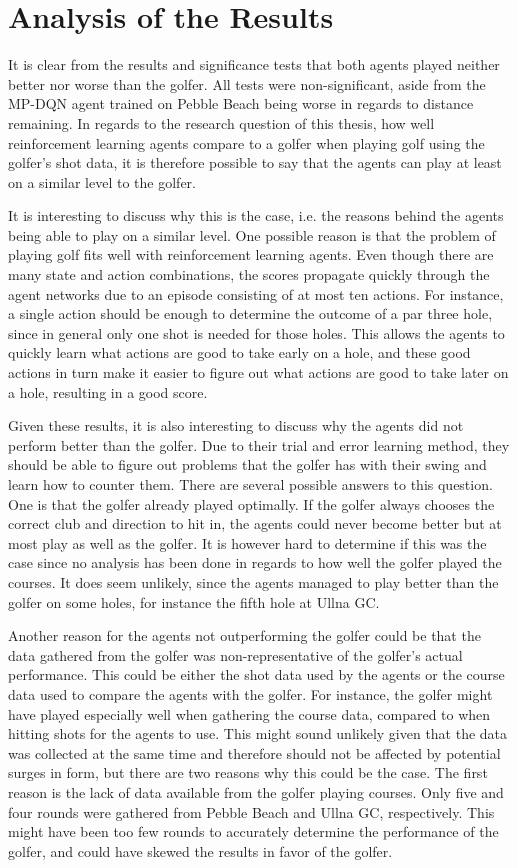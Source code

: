 \documentclass{kththesis}
\begin{document}
\section{Analysis of the Results}
It is clear from the results and significance tests that both agents played neither better nor worse than the golfer. All tests were non-significant, aside from the MP-DQN agent trained on Pebble Beach being worse in regards to distance remaining. In regards to the research question of this thesis, how well reinforcement learning agents compare to a golfer when playing golf using the golfer's shot data, it is therefore possible to say that the agents can play at least on a similar level to the golfer.

It is interesting to discuss why this is the case, i.e. the reasons behind the agents being able to play on a similar level. One possible reason is that the problem of playing golf fits well with reinforcement learning agents. Even though there are many state and action combinations, the scores propagate quickly through the agent networks due to an episode consisting of at most ten actions. For instance, a single action should be enough to determine the outcome of a par three hole, since in general only one shot is needed for those holes. This allows the agents to quickly learn what actions are good to take early on a hole, and these good actions in turn make it easier to figure out what actions are good to take later on a hole, resulting in a good score.

Given these results, it is also interesting to discuss why the agents did not perform better than the golfer. Due to their trial and error learning method, they should be able to figure out problems that the golfer has with their swing and learn how to counter them. There are several possible answers to this question. One is that the golfer already played optimally. If the golfer always chooses the correct club and direction to hit in, the agents could never become better but at most play as well as the golfer. It is however hard to determine if this was the case since no analysis has been done in regards to how well the golfer played the courses. It does seem unlikely, since the agents managed to play better than the golfer on some holes, for instance the fifth hole at Ullna GC. 

Another reason for the agents not outperforming the golfer could be that the data gathered from the golfer was non-representative of the golfer's actual performance. This could be either the shot data used by the agents or the course data used to compare the agents with the golfer. For instance, the golfer might have played especially well when gathering the course data, compared to when hitting shots for the agents to use. This might sound unlikely given that the data was collected at the same time and therefore should not be affected by potential surges in form, but there are two reasons why this could be the case. The first reason is the lack of data available from the golfer playing courses. Only five and four rounds were gathered from Pebble Beach and Ullna GC, respectively. This might have been too few rounds to accurately determine the performance of the golfer, and could have skewed the results in favor of the golfer.
\end{document}
